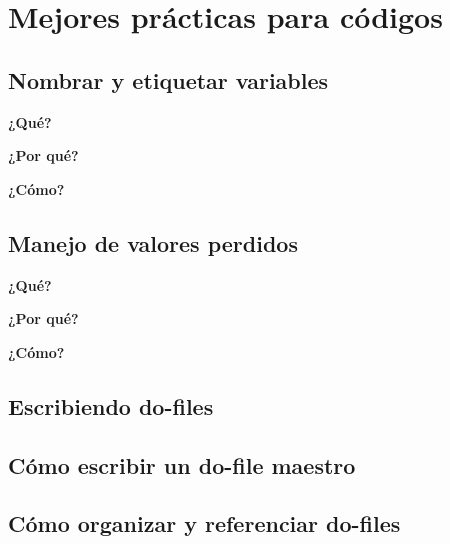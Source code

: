 \documentclass[11pt,en]{elegantpaper}
\begin{document}
\section{Mejores prácticas para códigos}
\label{sec:practicas}

\subsection{Nombrar y etiquetar variables}
\label{sec:variables}
\textbf{¿Qué?}


\textbf{¿Por qué?} 


\textbf{¿Cómo?} 
\subsection{Manejo de valores perdidos}
\label{sec:missings}
\textbf{¿Qué?}


\textbf{¿Por qué?}


\textbf{¿Cómo?}
\subsection{Escribiendo do-files}
\label{sec:dofiles}

\subsection{Cómo escribir un do-file maestro}
\label{sec:domaestro}

\subsection{Cómo organizar y referenciar do-files}
\label{sec:doorganizar}
\end{document}
